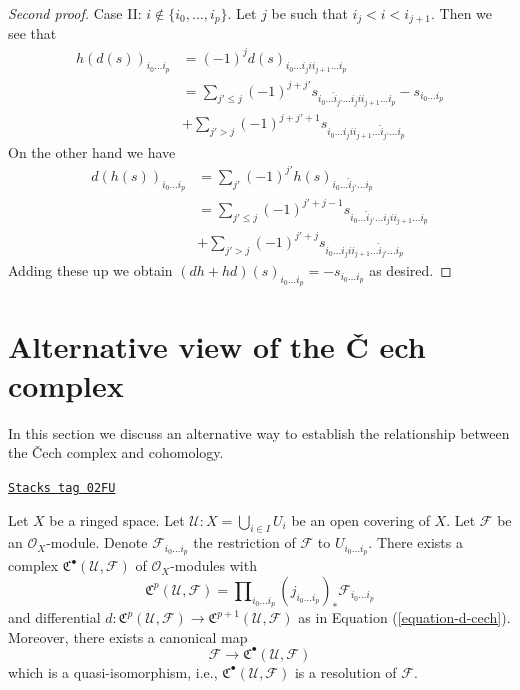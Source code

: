 \begin{proof}[Second proof]
\medskip\noindent
Case II: $i \not \in \{i_0, \ldots, i_p\}$. Let $j$ be such that
$i_j < i < i_{j + 1}$. Then we see that
\begin{align*}
h(d(s))_{i_0 \ldots i_p}
& =
(-1)^j d(s)_{i_0 \ldots i_j i i_{j + 1} \ldots i_p} \\
& =
\sum\nolimits_{j' \leq j} (-1)^{j + j'}
s_{i_0 \ldots \hat i_{j'} \ldots i_j i i_{j + 1} \ldots i_p} -
s_{i_0 \ldots i_p} \\
&
+ \sum\nolimits_{j' > j} (-1)^{j + j' + 1}
s_{i_0 \ldots i_j i i_{j + 1} \ldots \hat i_{j'} \ldots i_p}
\end{align*}
On the other hand we have
\begin{align*}
d(h(s))_{i_0 \ldots i_p}
& =
\sum\nolimits_{j'} (-1)^{j'} h(s)_{i_0 \ldots \hat i_{j'} \ldots i_p} \\
& =
\sum\nolimits_{j' \leq j} (-1)^{j' + j - 1}
s_{i_0 \ldots \hat i_{j'} \ldots i_j i i_{j + 1} \ldots i_p} \\
& +
\sum\nolimits_{j' > j} (-1)^{j' + j}
s_{i_0 \ldots i_j i i_{j + 1} \ldots \hat i_{j'} \ldots i_p}
\end{align*}
Adding these up we obtain
$(dh + hd)(s)_{i_0 \ldots i_p} = - s_{i_0 \ldots i_p}$
as desired.
\end{proof}

\section{Alternative view of the {\v C}
ech complex}
\label{cohomology-section-locally-finite-cech}

In this section we discuss an alternative way to establish the relationship
between the {\v C}ech complex and cohomology.

\begin{lemma}
\label{cohomology-lemma-covering-resolution}
\href{https://stacks.math.columbia.edu/tag/02FU}{\texttt{Stacks tag 02FU}}

Let $X$ be a ringed space. Let $\mathcal{U} : X = \bigcup_{i \in I} U_i$
be an open covering of $X$. Let $\mathcal{F}$ be an $\mathcal{O}_X$-module.
Denote $\mathcal{F}_{i_0 \ldots i_p}$ the restriction of
$\mathcal{F}$ to $U_{i_0 \ldots i_p}$. There exists a complex
${\mathfrak C}^\bullet(\mathcal{U}, \mathcal{F})$
of $\mathcal{O}_X$-modules with
$$
{\mathfrak C}^p(\mathcal{U}, \mathcal{F}) =
\prod\nolimits_{i_0 \ldots i_p}
(j_{i_0 \ldots i_p})_* \mathcal{F}_{i_0 \ldots i_p}
$$
and differential
$d : {\mathfrak C}^p(\mathcal{U}, \mathcal{F})
\to {\mathfrak C}^{p + 1}(\mathcal{U}, \mathcal{F})$
as in Equation (\ref{equation-d-cech}). Moreover, there exists a canonical
map
$$
\mathcal{F} \to {\mathfrak C}^\bullet(\mathcal{U}, \mathcal{F})
$$
which is a quasi-isomorphism, i.e.,
${\mathfrak C}^\bullet(\mathcal{U}, \mathcal{F})$
is a resolution of $\mathcal{F}$.
\end{lemma}

